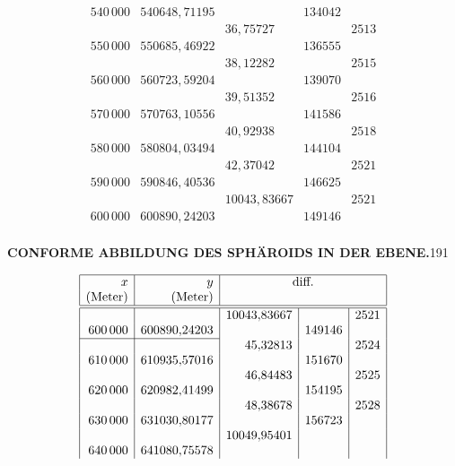 {\[\begin{array}{|r|r|r|r|r|}
540\,000&540648{,}71195&&134042&\\
&&36{,}75727&&2513\\
550\,000&550685{,}46922&&136555&\\
&&38{,}12282&&2515\\
560\,000&560723{,}59204&&139070&\\
&&39{,}51352&&2516\\
570\,000&570763{,}10556&&141586&\\
&&40{,}92938&&2518\\
580\,000&580804{,}03494&&144104&\\
&&42{,}37042&&2521\\
590\,000&590846{,}40536&&146625&\\
&&10043{,}83667&&2521\\
600\,000&600890{,}24203&&149146&\\
\end{array}\]
}


\par\clearpage
\noindent\null\hfill{\small\textbf{CONFORME ABBILDUNG DES SPHÄROIDS IN DER EBENE.}}\hfill191\par\medskip
{\small\renewcommand{\arraystretch}{.85}
\[\begin{array}{|r|r|r|r|r|}\hline
x&y&\multicolumn{3}{c|}{\text{diff.}}\\
\text{(Meter)}&\text{(Meter)}&\multicolumn{3}{c|}{}\\\hline\hline
&&10043{,}83667&&2521\\
600\,000&600890{,}24203&&149146&\\
\cline{1-2}
&&45{,}32813&&2524\\
610\,000&610935{,}57016&&151670&\\
&&46{,}84483&&2525\\
620\,000&620982{,}41499&&154195&\\
&&48{,}38678&&2528\\
630\,000&631030{,}80177&&156723&\\
&&10049{,}95401&&\\
640\,000&641080{,}75578&&&\\
\end{array}\]
}

